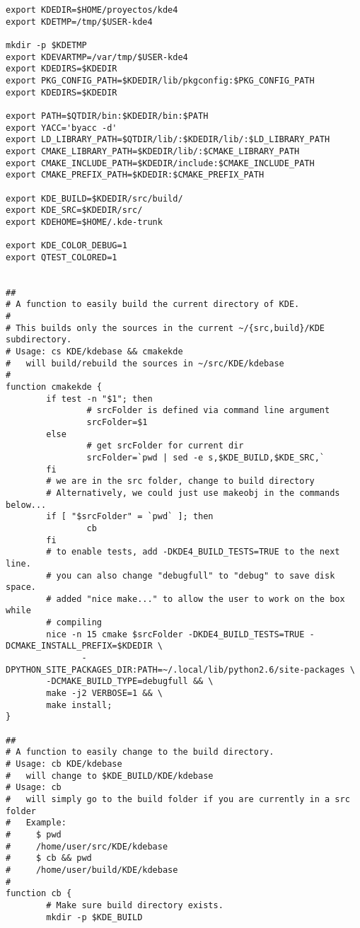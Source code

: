 \begin{verbatim}
export KDEDIR=$HOME/proyectos/kde4
export KDETMP=/tmp/$USER-kde4

mkdir -p $KDETMP
export KDEVARTMP=/var/tmp/$USER-kde4
export KDEDIRS=$KDEDIR
export PKG_CONFIG_PATH=$KDEDIR/lib/pkgconfig:$PKG_CONFIG_PATH
export KDEDIRS=$KDEDIR

export PATH=$QTDIR/bin:$KDEDIR/bin:$PATH
export YACC='byacc -d'
export LD_LIBRARY_PATH=$QTDIR/lib/:$KDEDIR/lib/:$LD_LIBRARY_PATH
export CMAKE_LIBRARY_PATH=$KDEDIR/lib/:$CMAKE_LIBRARY_PATH
export CMAKE_INCLUDE_PATH=$KDEDIR/include:$CMAKE_INCLUDE_PATH
export CMAKE_PREFIX_PATH=$KDEDIR:$CMAKE_PREFIX_PATH

export KDE_BUILD=$KDEDIR/src/build/
export KDE_SRC=$KDEDIR/src/
export KDEHOME=$HOME/.kde-trunk

export KDE_COLOR_DEBUG=1
export QTEST_COLORED=1

 
##
# A function to easily build the current directory of KDE.
#
# This builds only the sources in the current ~/{src,build}/KDE subdirectory.
# Usage: cs KDE/kdebase && cmakekde
#   will build/rebuild the sources in ~/src/KDE/kdebase
#
function cmakekde {
        if test -n "$1"; then
                # srcFolder is defined via command line argument
                srcFolder=$1
        else
                # get srcFolder for current dir
                srcFolder=`pwd | sed -e s,$KDE_BUILD,$KDE_SRC,`
        fi
        # we are in the src folder, change to build directory
        # Alternatively, we could just use makeobj in the commands below...
        if [ "$srcFolder" = `pwd` ]; then
                cb
        fi
        # to enable tests, add -DKDE4_BUILD_TESTS=TRUE to the next line.
        # you can also change "debugfull" to "debug" to save disk space.
        # added "nice make..." to allow the user to work on the box while
        # compiling
        nice -n 15 cmake $srcFolder -DKDE4_BUILD_TESTS=TRUE -DCMAKE_INSTALL_PREFIX=$KDEDIR \
               -DPYTHON_SITE_PACKAGES_DIR:PATH=~/.local/lib/python2.6/site-packages \
        -DCMAKE_BUILD_TYPE=debugfull && \
        make -j2 VERBOSE=1 && \
        make install;
}
 
##
# A function to easily change to the build directory.
# Usage: cb KDE/kdebase
#   will change to $KDE_BUILD/KDE/kdebase
# Usage: cb
#   will simply go to the build folder if you are currently in a src folder
#   Example:
#     $ pwd
#     /home/user/src/KDE/kdebase
#     $ cb && pwd
#     /home/user/build/KDE/kdebase
#
function cb {
        # Make sure build directory exists.
        mkdir -p $KDE_BUILD
 

\end{verbatim}
